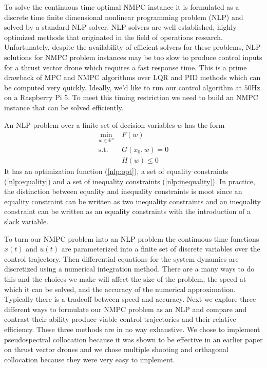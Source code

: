 \documentclass[]{article}
\newcommand{\mpc}{MPC}
\newcommand{\nmpc}{NMPC}
\newcommand{\R}{\mathbb{R}}
\begin{document}
	To solve the continuous time optimal {\nmpc} instance it is formulated as a discrete time finite dimensional nonlinear programming problem (NLP) and solved by a standard NLP solver.  NLP solvers are well established, highly optimized methods that originated in the field of operations research. Unfortunately, despite the availability of efficient solvers for these problems, NLP solutions for {\nmpc} problem instances may be too slow to produce control inputs for a thrust vector drone which requires a fast response time. This is a prime drawback of {\mpc} and {\nmpc} algorithms over LQR and PID  methods which can be computed very quickly.
	Ideally, we'd like to run our control algorithm at $50$Hz on a Raspberry Pi 5.  To meet this timing restriction we need to build an {\nmpc} instance that can be solved efficiently. 

	An NLP problem over a finite set of decision variables $w$ has the form 
	\begin{align}
		\min_{w \in \R^n} \; &  F(w) \label{nlp:opt} \\
		\text{s.t.} \;\; & G(x_0, w) = 0 \label{nlp:equality} \\
		&	H(w) \leq 0 \label{nlp:inequality}
	\end{align}
	It has an optimization function (\ref{nlp:opt}),  a set of equality constraints (\ref{nlp:equality}) and a set of inequality constraints (\ref{nlp:inequality}).
	In practice, the distinction between equality and inequality constraints is moot since an equality constraint can be written as two inequality constraints  and  an inequality constraint can be written as an equality constraints with the introduction of a slack variable. 

	To turn our {\nmpc} problem into an NLP problem  the continuous time functions $x(t)$ and $u(t)$ are parameterized into a finite set of discrete variables over the control trajectory.  Then differential equations for the system dynamics are discretized using a numerical integration method.  There are a many ways to do this and the choices we make will affect the size of the problem, the speed at which it can be solved, and the accuracy of the numerical approximation. Typically there is a tradeoff between speed and accuracy.  
	Next we explore three different ways to formulate our {\nmpc} problem as an NLP and compare and contrast their ability produce viable control trajectories and their relative efficiency.  These three methods are in no way exhaustive. We chose to implement pseudospectral collocation because it was shown to be effective in an earlier paper on thrust vector drones \citep{TVCDrone} and we chose multiple shooting and orthagonal collocation because they were very easy to implement.
\end{document}
